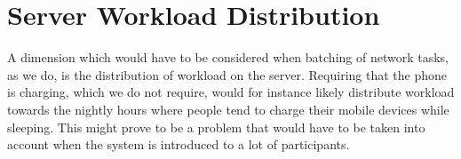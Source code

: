 \section{Server Workload Distribution}
A dimension which would have to be considered when batching of network tasks, as we do, is the distribution of workload on the server. Requiring that the phone is charging, which we do not require, would for instance likely distribute workload towards the nightly hours where people tend to charge their mobile devices while sleeping. This might prove to be a problem that would have to be taken into account when the system is introduced to a lot of participants.  